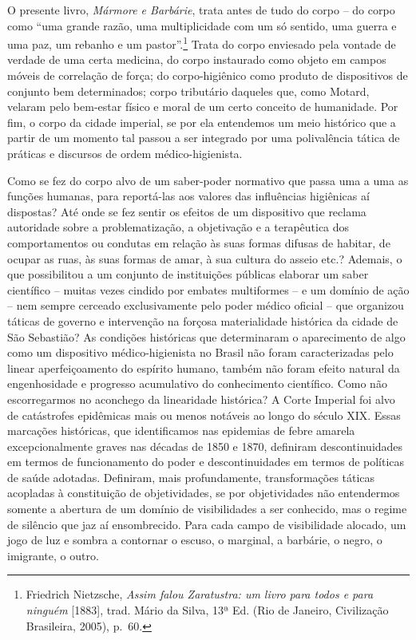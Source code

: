 \asterisc{} 

O presente livro, \emph{Mármore e Barbárie}, trata antes de tudo do
corpo -- do corpo como ``uma grande razão, uma multiplicidade com um só
sentido, uma guerra e uma paz, um rebanho e um pastor''.\footnote{Friedrich
  Nietzsche, \emph{Assim falou Zaratustra: um livro para todos e para
  ninguém} {[}1883{]}, trad. Mário da Silva, 13ª Ed. (Rio de Janeiro,
  Civilização Brasileira, 2005), p.~60.} Trata do corpo enviesado pela
vontade de verdade de uma certa medicina, do corpo instaurado como
objeto em campos móveis de correlação de força; do corpo-higiênico como
produto de dispositivos de conjunto bem determinados; corpo tributário
daqueles que, como Motard, velaram pelo bem-estar físico e moral de um
certo conceito de humanidade. Por fim, o corpo da cidade imperial, se
por ela entendemos um meio histórico que a partir de um momento tal
passou a ser integrado por uma polivalência tática de práticas e
discursos de ordem médico-higienista.

Como se fez do corpo alvo de um saber-poder normativo que passa uma a
uma as funções humanas, para reportá-las aos valores das influências
higiênicas aí dispostas? Até onde se fez sentir os efeitos de um
dispositivo que reclama autoridade sobre a problematização, a
objetivação e a terapêutica dos comportamentos ou condutas em relação às
suas formas difusas de habitar, de ocupar as ruas, às suas formas de
amar, à sua cultura do asseio etc.? Ademais, o que possibilitou a um
conjunto de instituições públicas elaborar um saber científico -- muitas
vezes cindido por embates multiformes -- e um domínio de ação -- nem
sempre cerceado exclusivamente pelo poder médico oficial -- que
organizou táticas de governo e intervenção na forçosa materialidade
histórica da cidade de São Sebastião? As condições históricas que
determinaram o aparecimento de algo como um dispositivo
médico-higienista no Brasil não foram caracterizadas pelo linear
aperfeiçoamento do espírito humano, também não foram efeito natural da
engenhosidade e progresso acumulativo do conhecimento científico. Como
não escorregarmos no aconchego da linearidade histórica? A Corte
Imperial foi alvo de catástrofes epidêmicas mais ou menos notáveis ao
longo do século XIX. Essas marcações históricas, que identificamos nas
epidemias de febre amarela excepcionalmente graves nas décadas de 1850 e
1870, definiram descontinuidades em termos de funcionamento do poder e
descontinuidades em termos de políticas de saúde adotadas. Definiram,
mais profundamente, transformações táticas acopladas à constituição de
objetividades, se por objetividades não entendermos somente a abertura
de um domínio de visibilidades a ser conhecido, mas o regime de silêncio
que jaz aí ensombrecido. Para cada campo de visibilidade alocado, um
jogo de luz e sombra a contornar o escuso, o marginal, a barbárie, o
negro, o imigrante, o outro.


